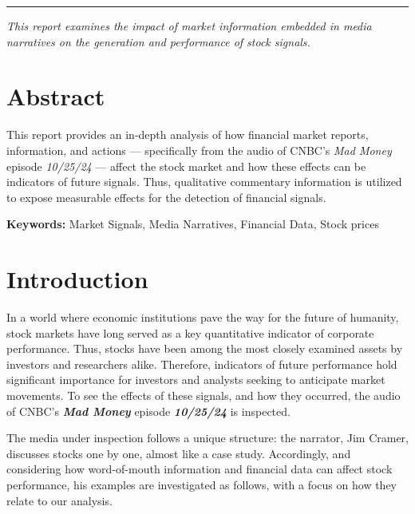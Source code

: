 \documentclass[12pt,a4paper]{article}
\begin{document}
\begin{titlepage}
    \vspace{1.2cm}

    {\color{SUblue}\rule{\textwidth}{0.8pt}}\par
    \vspace{0.2cm}
   {\small \textit{This report examines the impact of market information embedded in media narratives on the generation and performance of stock signals.}}

\end{titlepage}

\setcounter{page}{1}

\newpage
\section*{Abstract}
This report provides an in-depth analysis of how financial market reports, information, and actions --- specifically from the audio of CNBC's \textit{Mad Money} episode \textit{10/25/24} --- affect the stock market and how these effects can be indicators of future signals. Thus, qualitative commentary information is utilized to expose measurable effects for the detection of financial signals.

\vspace{1cm}
\textbf{Keywords:} Market Signals, Media Narratives, Financial Data, Stock prices

\section*{Introduction}
In a world where economic institutions pave the way for the future of humanity, 
stock markets have long served as a key quantitative indicator of corporate performance. 
Thus, stocks have been among the most closely examined assets by investors and researchers alike. 
Therefore, indicators of future performance hold significant importance for investors and analysts seeking to anticipate market movements. 
To see the effects of these signals, and how they occurred, the audio of CNBC's \textbf{\textit{Mad Money}} episode \textit{\textbf{10/25/24}} is inspected.

\vspace{1cm}
The media under inspection follows a unique structure: the narrator, Jim Cramer, 
discusses stocks one by one, almost like a case study. 
Accordingly, and considering how word-of-mouth information and financial data 
can affect stock performance, his examples are investigated as follows, 
with a focus on how they relate to our analysis.
\end{document}

